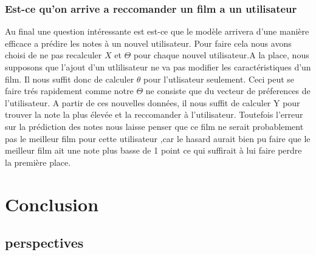 \documentclass[a4paper,10pt]{article}
\begin{document}
\subsubsection{Est-ce qu'on arrive a reccomander un film a un utilisateur}
Au final une question intéressante est est-ce que le modèle arrivera d'une manière efficace a prédire les notes à un nouvel utilisateur. Pour faire cela nous avons
choisi de ne pas recalculer $X$ et $\Theta$ pour chaque nouvel utilisateur.A la place, nous supposons que l'ajout d'un utlilisateur ne va pas modifier
les caractéristiques d'un film. Il nous suffit donc de calculer $\theta$ pour l'utlisateur seulement. Ceci peut se faire trés rapidement comme notre $\Theta$ ne
consiste que du vecteur de préferences de l'utilisateur. A partir de ces nouvelles données, il nous suffit de calculer Y pour trouver la note la plus élevée et la reccomander
à l'utilisateur. Toutefois l'erreur sur la prédiction des notes nous laisse penser que ce film ne serait probablement pas le meilleur film
pour cette utilisateur ,car le hasard aurait bien pu faire que le meilleur film ait une note plus basse de 1 point ce qui suffirait à lui faire perdre la première place.
\section{Conclusion}

\subsection{perspectives}
\end{document}
